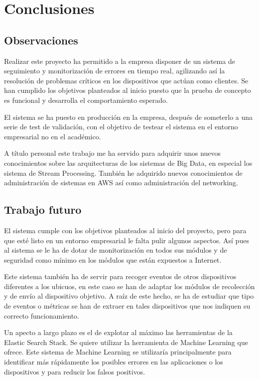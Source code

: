 \chapter{Conclusiones}

\section{Observaciones}

Realizar este proyecto ha permitido a la empresa disponer de un sistema de seguimiento y monitorización de errores en tiempo real, agilizando así la resolución de problemas críticos en los dispositivos que actúan como clientes. Se han cumplido los objetivos planteados al inicio puesto que la prueba de concepto es funcional y desarrolla el comportamiento esperado.

El sistema se ha puesto en producción en la empresa, después de someterlo a una serie de test de validación, con el objetivo de testear el sistema en el entorno empresarial no en el académico.

A título personal este trabajo me ha servido para adquirir unos nuevos conocimientos sobre las arquitecturas de los sistemas de Big Data, en especial los sistema de Stream Processing. También he adquirido nuevos conocimientos de administración de sistemas en AWS así como administración del networking.

\section{Trabajo futuro}

El sistema cumple con los objetivos planteados al inicio del proyecto, pero para que esté listo en un entorno empresarial le falta pulir algunos aspectos.
Así pues al sistema se le ha de dotar de monitorización en todos sus módulos y de seguridad como mínimo en los módulos que están expuestos a Internet.

Este sistema también ha de servir para recoger eventos de otros dispositivos diferentes a los ubicuos, en este caso se han de adaptar los módulos de recolección y de envío al dispositivo objetivo. A raíz de este hecho, se ha de estudiar que tipo de eventos o métricas se han de extraer en tales dispositivos que nos indiquen su correcto funcionamiento.

Un apecto a largo plazo es el de explotar al máximo las herramientas de la Elastic Search Stack. Se quiere utilizar la herramienta de Machine Learning que ofrece. Este sistema de Machine Learning se utilizaría principalmente para identificar más rápidamente los posibles errores en las aplicaciones o los dispositivos y para reducir los falsos positivos.




